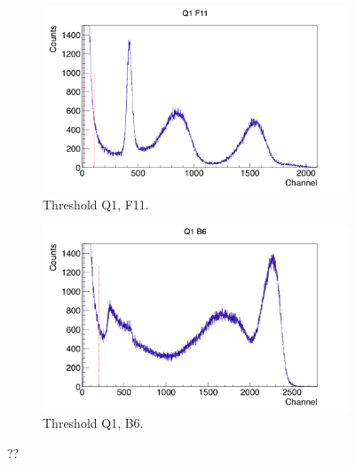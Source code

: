 \documentclass[twoside,english]{uiofysmaster/uiofysmaster}
\begin{document}
%
%
%

\begin{figure}[ht]
	\centering
	\begin{subfigure}{\textwidth}
		\centering
		\includegraphics[width=\textwidth]{../Plots/plotting/Threshold_Q1_f11.png}
		\caption{Threshold Q1, F11.}
		\label{fig:Threshold_f}
	\end{subfigure}
	\begin{subfigure}{\textwidth}
		\centering
		\includegraphics[width=\textwidth]{../Plots/plotting/Threshold_Q1_b6.png}
		\caption{Threshold Q1, B6.}
		\label{fig:Threshold_b}
	\end{subfigure}
	\caption{??}
	\label{fig:Threshold}
\end{figure}
\end{document}
